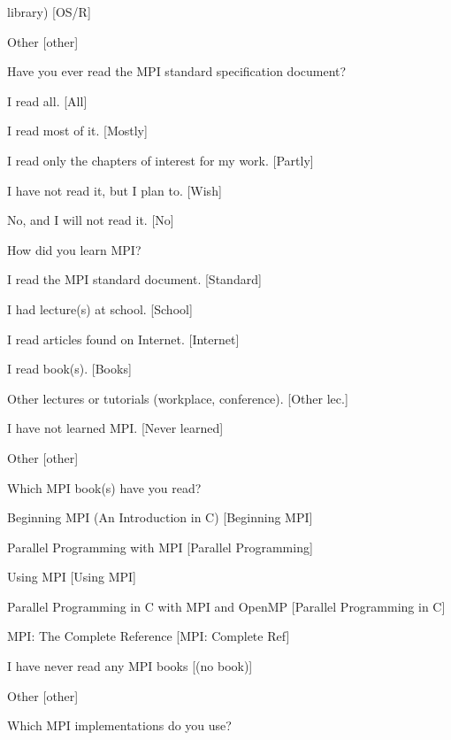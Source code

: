 \documentclass[preprint,5p,times]{elsarticle}
\begin{document}
{\begin{description}
\begin{inparaenum}[{\bf C}1)]
      library) [OS/R]
    \item Other [other]
    \end{inparaenum}
  \item[Q9:] Have you ever read the MPI standard specification document?
    \begin{inparaenum}[{\bf C}1)]
    \item I read all. [All]
    \item I read most of it. [Mostly]
    \item I read only the chapters of interest for my work. [Partly]
    \item I have not read it, but I plan to. [Wish]
    \item No, and I will not read it. [No]
    \end{inparaenum}
  \item[Q10*:] How did you learn MPI?
    \begin{inparaenum}[{\bf C}1)]
    \item I read the MPI standard document. [Standard]
    \item I had lecture(s) at school. [School]
    \item I read articles found on Internet. [Internet]
    \item I read book(s). [Books]
    \item Other lectures or tutorials (workplace, conference). [Other lec.]
    \item I have not learned MPI. [Never learned]
    \item Other [other]
    \end{inparaenum}
  \item[Q11*:] Which MPI book(s) have you read?
    \begin{inparaenum}[{\bf C}1)]
    \item Beginning MPI (An Introduction in C) [Beginning MPI]
    \item Parallel Programming with MPI [Parallel Programming]
    \item Using MPI [Using MPI]
    \item Parallel Programming in C with MPI and OpenMP [Parallel
      Programming in C]
    \item MPI: The Complete Reference [MPI: Complete Ref]
    \item I have never read any MPI books [(no book)]
    \item Other [other]
    \end{inparaenum}
  \item[Q12*:] Which MPI implementations do you use?

\end{description}}
\end{document}
